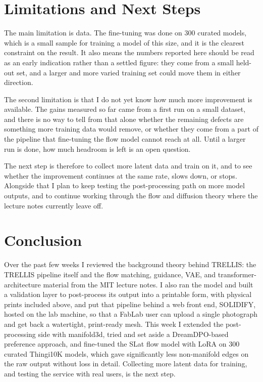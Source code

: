 \documentclass[11pt,a4paper]{article}
\begin{document}
\section{Limitations and Next Steps}
The main limitation is data. The fine-tuning was done on 300 curated models, which is a small sample for training a model of this size, and it is the clearest constraint on the result. It also means the numbers reported here should be read as an early indication rather than a settled figure: they come from a small held-out set, and a larger and more varied training set could move them in either direction.

The second limitation is that I do not yet know how much more improvement is available. The gains measured so far came from a first run on a small dataset, and there is no way to tell from that alone whether the remaining defects are something more training data would remove, or whether they come from a part of the pipeline that fine-tuning the flow model cannot reach at all. Until a larger run is done, how much headroom is left is an open question.

The next step is therefore to collect more latent data and train on it, and to see whether the improvement continues at the same rate, slows down, or stops. Alongside that I plan to keep testing the post-processing path on more model outputs, and to continue working through the flow and diffusion theory where the lecture notes currently leave off.


\section{Conclusion}
Over the past few weeks I reviewed the background theory behind TRELLIS: the TRELLIS pipeline itself and the flow matching, guidance, VAE, and transformer-architecture material from the MIT lecture notes. I also ran the model and built a validation layer to post-process its output into a printable form, with physical prints included above, and put that pipeline behind a web front end, SOLIDIFY, hosted on the lab machine, so that a FabLab user can upload a single photograph and get back a watertight, print-ready mesh. This week I extended the post-processing side with manifold3d, tried and set aside a DreamDPO-based preference approach, and fine-tuned the SLat flow model with LoRA on 300 curated Thingi10K models, which gave significantly less non-manifold edges on the raw output without loss in detail. Collecting more latent data for training, and testing the service with real users, is the next step.
\end{document}
